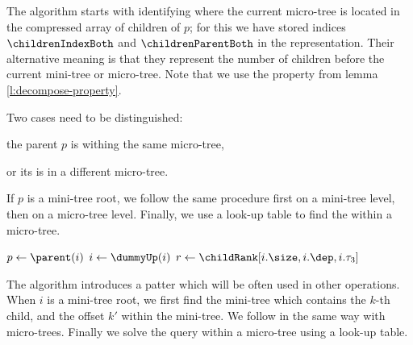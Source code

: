 The \childRank{} algorithm starts with  identifying where the current micro-tree is located in the compressed array of children of $p$; for this we have stored indices $\childrenIndexBoth$ and $\childrenParentBoth$ in the representation.
Their alternative meaning is that they represent the number of children before the current mini-tree or micro-tree.
Note that we use the property from lemma \ref{l:decompose-property}.

Two cases need to be distinguished:
\begin{enuminline}
	\item the parent $p$ is withing the same micro-tree,
	\item or its is in a different micro-tree.
\end{enuminline}
If $p$ is a mini-tree root, we follow the same procedure first on a mini-tree level, then on a micro-tree level.
Finally, we use a look-up table to find the \childRank{} within a micro-tree.

\begin{algorithm}
\begin{algorithmic}
	\State $p \gets \parent(i)$
	\State $i \gets \dummyUp(i)$ 
		\State {}
		 
			\State {}
		\Else {}
			\State {}
		\EndIf
		 
			 
				\State $r \gets \childRank[i.\size, i.\dep, i.\tau_3]$
				\State {}
			\Else {}
				\State {}
			\EndIf
		\Else {}
			\State {}
		\EndIf
	\Else
		\State {}
	\EndIf
\EndFunction
\end{algorithmic}
\end{algorithm}

The algorithm \childSelect{} introduces a patter which will be often used in other operations.
When $i$ is a mini-tree root, we first find the mini-tree which contains the $k$-th child, and the offset $k'$ within the mini-tree.
We follow in the same way with micro-trees.
Finally we solve the query within a micro-tree using a look-up table.

